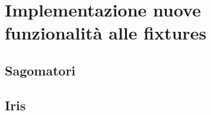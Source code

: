\documentclass[main.tex]{subfiles}
\begin{document}
\sloppy


\vspace{1.0cm}

\section{Implementazione nuove funzionalità alle fixtures}\label{sec:NewFeatures}

\subsection{Sagomatori}\label{subsec:5_shaper}

\subsection{Iris}\label{subsec:5_Iris}
\end{document}
